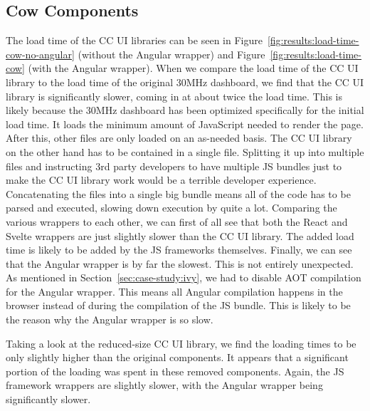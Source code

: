\subsection{Cow Components}
The load time of the CC UI libraries can be seen in Figure~\ref{fig:results:load-time-cow-no-angular} (without the Angular wrapper) and Figure~\ref{fig:results:load-time-cow} (with the Angular wrapper). When we compare the load time of the CC UI library to the load time of the original 30MHz dashboard, we find that the CC UI library is significantly slower, coming in at about twice the load time. This is likely because the 30MHz dashboard has been optimized specifically for the initial load time. It loads the minimum amount of JavaScript needed to render the page. After this, other files are only loaded on an as-needed basis. The CC UI library on the other hand has to be contained in a single file. Splitting it up into multiple files and instructing 3rd party developers to have multiple JS bundles just to make the CC UI library work would be a terrible developer experience. Concatenating the files into a single big bundle means all of the code has to be parsed and executed, slowing down execution by quite a lot. Comparing the various wrappers to each other, we can first of all see that both the React and Svelte wrappers are just slightly slower than the CC UI library. The added load time is likely to be added by the JS frameworks themselves. Finally, we can see that the Angular wrapper is by far the slowest. This is not entirely unexpected. As mentioned in Section~\ref{sec:case-study:ivy}, we had to disable AOT compilation for the Angular wrapper. This means all Angular compilation happens in the browser instead of during the compilation of the JS bundle. This is likely to be the reason why the Angular wrapper is so slow.

Taking a look at the reduced-size CC UI library, we find the loading times to be only slightly higher than the original components. It appears that a significant portion of the loading was spent in these removed components. Again, the JS framework wrappers are slightly slower, with the Angular wrapper being significantly slower.

